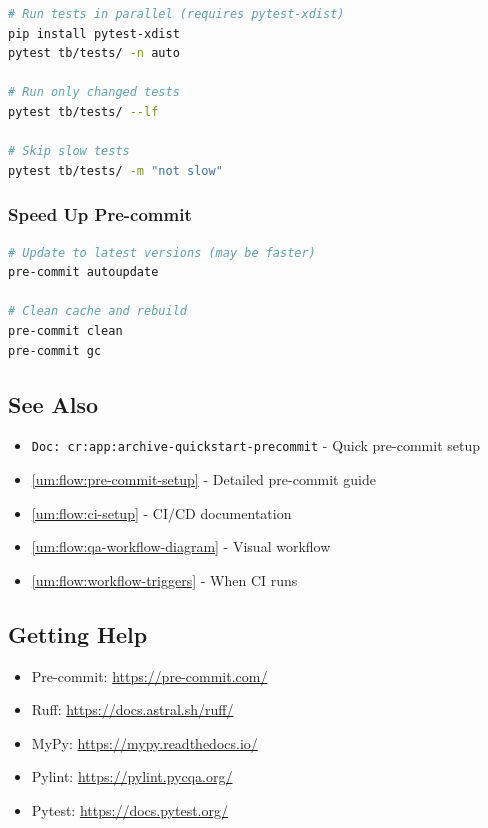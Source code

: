 \begin{lstlisting}[language=bash]
# Run tests in parallel (requires pytest-xdist)
pip install pytest-xdist
pytest tb/tests/ -n auto

# Run only changed tests
pytest tb/tests/ --lf

# Skip slow tests
pytest tb/tests/ -m "not slow"
\end{lstlisting}

\subsubsection{Speed Up Pre-commit}\label{um:guide:local-qa:speed-up-pre-commit}

\begin{lstlisting}[language=bash]
# Update to latest versions (may be faster)
pre-commit autoupdate

# Clean cache and rebuild
pre-commit clean
pre-commit gc
\end{lstlisting}

\subsection{See Also}\label{um:guide:local-qa:see-also}

\begin{itemize}
\tightlist
\item
  \texttt{Doc:\allowbreak{}\ cr:\allowbreak{}app:\allowbreak{}archive-\allowbreak{}quickstart-\allowbreak{}precommit}
  - Quick pre-commit setup
\item
  \cref{um:flow:pre-commit-setup} - Detailed pre-commit guide
\item
  \cref{um:flow:ci-setup} - CI/CD documentation
\item
  \cref{um:flow:qa-workflow-diagram} - Visual workflow
\item
  \cref{um:flow:workflow-triggers} - When CI runs
\end{itemize}

\subsection{Getting Help}\label{um:guide:local-qa:getting-help}

\begin{itemize}
\tightlist
\item
  Pre-commit:
  \href{https://pre-commit.com/}{https:/\allowbreak{}/\allowbreak{}pre-commit.com/}
\item
  Ruff:
  \href{https://docs.astral.sh/ruff/}{https:/\allowbreak{}/\allowbreak{}docs.astral.sh/\allowbreak{}ruff/}
\item
  MyPy:
  \href{https://mypy.readthedocs.io/}{https:/\allowbreak{}/\allowbreak{}mypy.readthedocs.io/}
\item
  Pylint:
  \href{https://pylint.pycqa.org/}{https:/\allowbreak{}/\allowbreak{}pylint.pycqa.org/}
\item
  Pytest:
  \href{https://docs.pytest.org/}{https:/\allowbreak{}/\allowbreak{}docs.pytest.org/}
\end{itemize}

